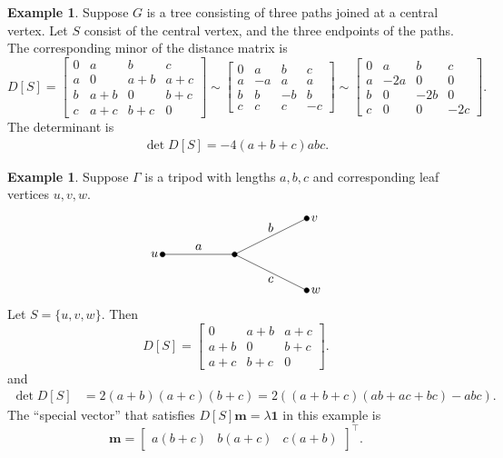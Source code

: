 \documentclass{amsart}
\theoremstyle{definition}
\newtheorem{eg}[thm]{Example}
\newcommand{\boldm}{\mathbf{m}}
\newcommand{\tr}{\intercal}
\begin{document}
\begin{eg}
Suppose $G$ is a tree consisting of three paths joined at a central vertex.
Let $S$ consist of the central vertex, and the three endpoints of the paths. 
The corresponding minor of the distance matrix is
\[
	D[S] = \begin{bmatrix}
	0 & a & b & c \\
	a & 0 & a + b & a + c \\
	b & a + b & 0 & b + c \\
	c & a + c & b + c & 0
	\end{bmatrix}
	\sim \begin{bmatrix}
	0 & a & b & c \\
	a & -a & a  & a \\
	b & b & -b & b \\
	c & c & c & -c
	\end{bmatrix}
	\sim \begin{bmatrix}
	0 & a & b & c \\
	a & -2a & 0 & 0 \\
	b & 0 & -2b & 0 \\
	c & 0 & 0 & -2c
	\end{bmatrix}.
\]
The determinant is
\begin{align*}
	\det D[S] = -4(a+b+c)abc.
\end{align*}
\end{eg}

\begin{eg}
Suppose $\Gamma$ is a tripod with lengths $a,b,c$ and corresponding leaf vertices $u,v,w$.
\[
\begin{tikzpicture}
	\filldraw[black] (-2,0) coordinate (u) circle (2pt);
	\filldraw[black] (2,1) coordinate (v) circle (2pt);
	\filldraw[black] (2,-1) coordinate (w) circle (2pt);
	\filldraw[black] (0,0) coordinate(o) circle (2pt);

	\draw (o) -- (u);
	\draw (v) -- (o) -- (w);

	\node[left] at (u) {$u$};
	\node[right] at (v) {$v$};
	\node[right] at (w) {$w$};

	\node[above] at (-1,0) {$a$};
	\node[above] at (1,0.5) {$b$};
	\node[below] at (1,-0.5) {$c$};
\end{tikzpicture}
\]
Let $S = \{u,v,w\}$.
Then 
$$
D[S] = \begin{bmatrix}
0 & a + b & a + c \\
a + b & 0 & b + c \\
a + c & b + c & 0
\end{bmatrix}.
$$
and
\begin{align*}
	\det D[S] &= 2(a+b)(a+c)(b+c) 
	= 2\left( (a+b+c)(ab + ac + bc) - abc \right).
\end{align*}
The ``special vector'' that satisfies $D[S] \boldm = \lambda \mathbf{1}$ in this example is 
$$
\boldm = \begin{bmatrix} a(b + c) & b(a + c) & c(a + b) \end{bmatrix}^\tr .
$$
\end{eg}
\end{document}
